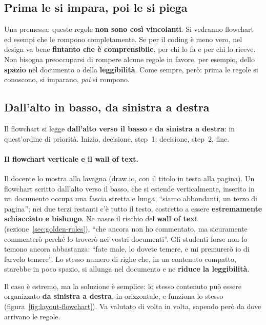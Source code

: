 \subsection{Prima le si impara, poi le si piega}

Una premessa: queste regole \textbf{non sono così vincolanti}. Si vedranno
flowchart ed esempi che le rompono completamente. Se per il coding è meno
vero, nel design va bene \textbf{fintanto che è comprensibile}, per chi lo
fa e per chi lo riceve. Non bisogna preoccuparsi di rompere alcune regole in
favore, per esempio, dello \textbf{spazio} nel documento o della
\textbf{leggibilità}. Come sempre, però: prima le regole si conoscono, si
imparano, \emph{poi} si rompono.

\subsection{Dall'alto in basso, da sinistra a destra}

Il flowchart si legge \textbf{dall'alto verso il basso} e \textbf{da sinistra
a destra}: in quest'ordine di priorità. Inizio, decisione, step~1; decisione,
step~2, fine.

\paragraph{Il flowchart verticale e il wall of text.} Il docente lo mostra
alla lavagna (draw.io, con il titolo in testa alla pagina). Un flowchart
scritto dall'alto verso il basso, che si estende verticalmente, inserito in
un documento occupa una fascia stretta e lunga, ``siamo abbondanti, un terzo
di pagina''; nei due terzi restanti c'è tutto il testo, costretto a essere
\textbf{estremamente schiacciato e bislungo}. Ne nasce il rischio del
\textbf{wall of text} (sezione~\ref{sec:golden-rules}), ``che ancora non ho
commentato, ma sicuramente commenterò perché lo troverò nei vostri
documenti''. Gli studenti forse non lo temono ancora abbastanza: ``fate male,
lo dovete temere, e mi premurerò io di farvelo temere''. Lo stesso numero di
righe che, in un contenuto compatto, starebbe in poco spazio, si allunga nel
documento e ne \textbf{riduce la leggibilità}.

Il caso è estremo, ma la soluzione è semplice: lo stesso contenuto può essere
organizzato \textbf{da sinistra a destra}, in orizzontale, e funziona lo
stesso (figura~\ref{fig:layout-flowchart}). Va valutato di volta in volta,
sapendo però da dove arrivano le regole.


